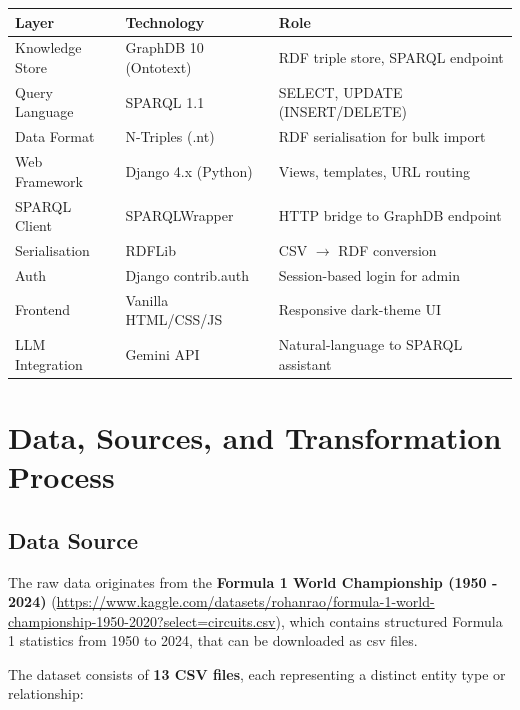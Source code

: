 \documentclass[12pt,a4paper]{article}
\begin{document}
\begin{center}
\begin{tabular}{@{}lll@{}}
\toprule
\textbf{Layer}     & \textbf{Technology}      & \textbf{Role} \\
\midrule
Knowledge Store    & GraphDB 10 (Ontotext)    & RDF triple store, SPARQL endpoint \\
Query Language     & SPARQL 1.1               & SELECT, UPDATE (INSERT/DELETE) \\
Data Format        & N-Triples (.nt)          & RDF serialisation for bulk import \\
Web Framework      & Django 4.x (Python)      & Views, templates, URL routing \\
SPARQL Client      & SPARQLWrapper            & HTTP bridge to GraphDB endpoint \\
Serialisation      & RDFLib                   & CSV $\rightarrow$ RDF conversion \\
Auth               & Django contrib.auth      & Session-based login for admin \\
Frontend           & Vanilla HTML/CSS/JS      & Responsive dark-theme UI \\
LLM Integration    & Gemini API               & Natural-language to SPARQL assistant \\
\bottomrule
\end{tabular}
\end{center}

\section{Data, Sources, and Transformation Process}

\subsection{Data Source}

The raw data originates from the \textbf{Formula 1 World Championship (1950 - 2024)}
(\url{https://www.kaggle.com/datasets/rohanrao/formula-1-world-championship-1950-2020?select=circuits.csv}), which contains
structured Formula 1 statistics from 1950 to 2024, that can be downloaded as csv files. 

The dataset consists of \textbf{13 CSV files}, each representing a distinct
entity type or relationship:
\end{document}
